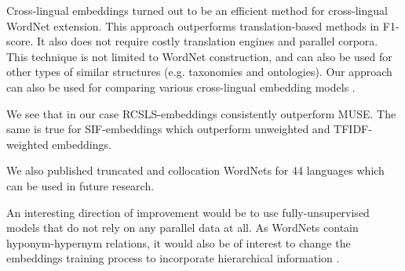 \documentclass[conference]{IEEEtran}
\newcommand{\LanguagesN}{44 }
\begin{document}
	Cross-lingual embeddings turned out to be an efficient method for cross-lingual WordNet extension. This approach outperforms translation-based methods in F1-score. It also does not require costly translation engines and parallel corpora. This technique is not limited to WordNet construction, and can also be used for other types of similar structures (e.g. taxonomies and ontologies). Our approach can also be used for comparing various cross-lingual embedding models \cite{Bakarov2018}.
	
	We see that in our case RCSLS-embeddings consistently outperform MUSE. The same is true for SIF-embeddings which outperform unweighted and TFIDF-weighted embeddings.
	
	We also published truncated and collocation WordNets for \LanguagesN languages which can be used in future research.
	
	An interesting direction of improvement would be to use fully-unsupervised models that do not rely on any parallel data at all.  As WordNets contain hyponym-hypernym relations, it would also be of interest to change the embeddings training process to incorporate hierarchical information \cite{alsuhaibani}.
	
	
	
\end{document}

